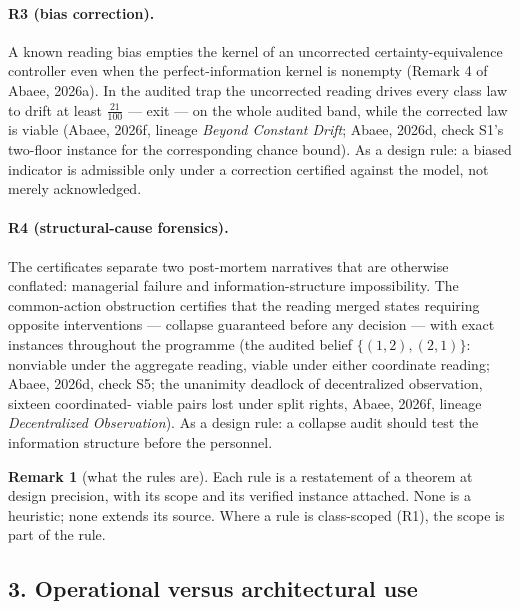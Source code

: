 \documentclass[10pt,twocolumn]{article}
\theoremstyle{definition}
\newtheorem{remark}{Remark}
\begin{document}
\paragraph{R3 (bias correction).}
A known reading bias empties the kernel of an uncorrected
certainty-equivalence controller even when the perfect-information kernel
is nonempty (Remark 4 of Abaee, 2026a). In the audited trap the
uncorrected reading drives every class law to drift at least
\(\tfrac{21}{100}\) --- exit --- on the whole audited band, while the
corrected law is viable (Abaee, 2026f, lineage \emph{Beyond Constant Drift};
Abaee, 2026d, check S1's two-floor instance for the corresponding chance
bound). As a design rule: a biased indicator is admissible only under a
correction certified against the model, not merely acknowledged.

\paragraph{R4 (structural-cause forensics).}
The certificates separate two post-mortem narratives that are otherwise
conflated: managerial failure and information-structure impossibility.
The common-action obstruction certifies that the reading merged states
requiring opposite interventions --- collapse guaranteed before any
decision --- with exact instances throughout the programme (the audited
belief \(\{(1,2),(2,1)\}\): nonviable under the aggregate reading,
viable under either coordinate reading; Abaee, 2026d, check S5; the
unanimity deadlock of decentralized observation, sixteen coordinated-
viable pairs lost under split rights, Abaee, 2026f, lineage \emph{Decentralized Observation}). As a design
rule: a collapse audit should test the information structure before the
personnel.

\begin{remark}[what the rules are]
Each rule is a restatement of a theorem at design precision, with its
scope and its verified instance attached. None is a heuristic; none
extends its source. Where a rule is class-scoped (R1), the scope is part
of the rule.
\end{remark}

\subsection{3. Operational versus architectural use}\label{levels}
\end{document}
